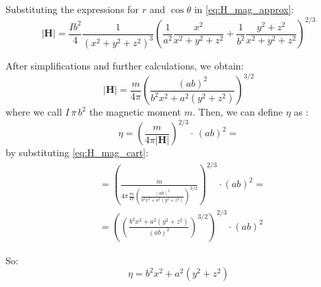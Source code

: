 Substituting the expressions for \(r\) and \(\cos\theta\) in \ref{eq:H_mag_approx}:
\[
\left| \mathbf{H} \right| = \frac{I b^2}{4} \frac{1}{(x^2 + y^2 + z^2)^{3}} \left(\frac{1}{a^2} \frac{x^2}{x^2 + y^2 + z^2} + \frac{1}{b^2} \frac{y^2 + z^2}{x^2 + y^2 + z^2}\right)^{2/3}
\]

After simplifications and further calculations, we obtain:
\begin{equation}
    \left| \mathbf{H} \right| = \frac{m}{4 \pi} \left(\frac{(ab)^2}{b^2 x^2 + a^2 (y^2 + z^2)}\right)^{3/2}
    \label{eq:H_mag_cart}
\end{equation}
where we call $I \, \pi \, b^2$ the magnetic moment $m$.
Then, we can define $\eta$ as \cite{main}:
\[ \eta = \left( \frac{m}{4 \pi \left| \mathbf{H} \right|} \right)^{2/3} \cdot \, (ab)^2 = \]
by substituting \ref{eq:H_mag_cart}:
\[
\begin{aligned}
&= \left( \frac{m}{4 \pi \frac{m}{4 \pi} \left(\frac{(ab)^2}{b^2 x^2 + a^2 (y^2 + z^2)}\right)^{3/2}} \right)^{2/3} \cdot (ab)^2 = 
\\
&= \left( \left(\frac{b^2 x^2 + a^2 (y^2 + z^2)}{(ab)^2}\right)^{3/2}\right)^{2/3} \cdot (ab)^2
\end{aligned}
\]

So:
\begin{equation}
    \eta = b^2 x^2 + a^2 (y^2 + z^2)
    \label{eq:eta}
\end{equation}

